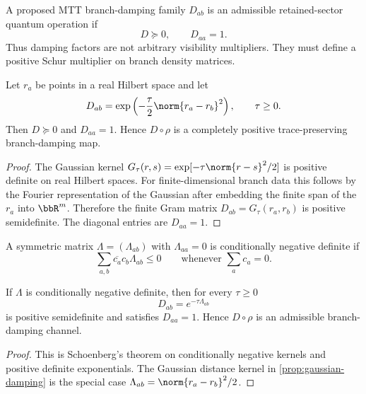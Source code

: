\documentclass[11pt]{article}
\begin{document}
\begin{corollary}
A proposed MTT branch-damping family \(D_{ab}\) is an admissible retained-sector quantum
operation if
\[
  D\succeq0,
  \qquad
  D_{aa}=1.
\]
Thus damping factors are not arbitrary visibility multipliers. They must define a positive
Schur multiplier on branch density matrices.
\end{corollary}

\begin{proposition}
\label{prop:gaussian-damping}
Let \(r_a\) be points in a real Hilbert space and let
\[
  D_{ab}
  =
  \exp\left(-\frac{\tau}{2}\norm{r_a-r_b}^2\right),
  \qquad \tau\ge0.
\]
Then \(D\succeq0\) and \(D_{aa}=1\). Hence \(D\circ\rho\) is a completely positive
trace-preserving branch-damping map.
\end{proposition}

\begin{proof}
The Gaussian kernel \(G_\tau(r,s)=\exp[-\tau\norm{r-s}^2/2]\) is positive definite on real
Hilbert spaces. For finite-dimensional branch data this follows by the Fourier representation
of the Gaussian after embedding the finite span of the \(r_a\) into \(\bbR^m\). Therefore the
finite Gram matrix \(D_{ab}=G_\tau(r_a,r_b)\) is positive semidefinite. The diagonal entries
are \(D_{aa}=1\).
\end{proof}

\begin{definition}
A symmetric matrix \(\Lambda=(\Lambda_{ab})\) with \(\Lambda_{aa}=0\) is conditionally
negative definite if
\[
  \sum_{a,b}\overline{c_a}c_b\Lambda_{ab}\le0
  \qquad
  \text{whenever }\sum_a c_a=0.
\]
\end{definition}

\begin{proposition}
\label{prop:schoenberg}
If \(\Lambda\) is conditionally negative definite, then for every \(\tau\ge0\)
\[
  D_{ab}=e^{-\tau\Lambda_{ab}}
\]
is positive semidefinite and satisfies \(D_{aa}=1\). Hence \(D\circ\rho\) is an admissible
branch-damping channel.
\end{proposition}

\begin{proof}
This is Schoenberg's theorem on conditionally negative kernels and positive definite
exponentials. The Gaussian distance kernel in \cref{prop:gaussian-damping} is the special
case \(\Lambda_{ab}=\norm{r_a-r_b}^2/2\).
\end{proof}
\end{document}
